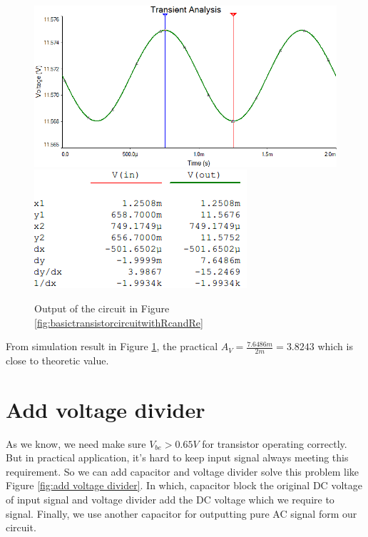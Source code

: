 \begin{figure}[htbp]
\centering
\includegraphics[scale=0.5]{"../Photo/Chap1/basic transistor ciruit output wave"}\\[0.5cm]
\includegraphics[scale=0.8]{"../Photo/Chap1/basic transistor ciruit output cursor data"}
\caption{Output of the circuit in Figure \ref{fig:basictransistorcircuitwithRcandRe} }
\label{fig:basictransistorciruitoutput}
\end{figure}

From simulation result in Figure \ref{fig:basictransistorciruitoutput}, the practical $A_V = \frac{7.6486m}{2m}=3.8243$ which is close to theoretic value.

\section{Add voltage divider}

As we know, we need make sure $ V_{be} > 0.65V $ for transistor operating correctly. But in practical application, it's hard to keep input signal always meeting this requirement. So we can add capacitor and voltage divider solve this problem like Figure \ref{fig:add voltage divider}. In which, capacitor block the original DC voltage of input signal and voltage divider add the DC voltage which we require to signal. Finally, we use another capacitor for outputting pure AC signal form our circuit. 

